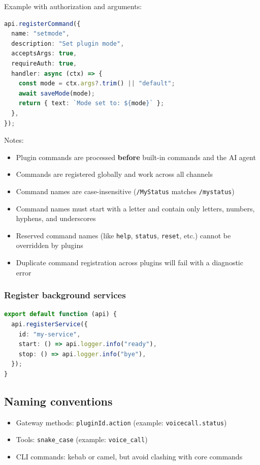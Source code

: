 Example with authorization and arguments:

\begin{lstlisting}[language=typescript]
api.registerCommand({
  name: "setmode",
  description: "Set plugin mode",
  acceptsArgs: true,
  requireAuth: true,
  handler: async (ctx) => {
    const mode = ctx.args?.trim() || "default";
    await saveMode(mode);
    return { text: `Mode set to: ${mode}` };
  },
});
\end{lstlisting}


Notes:

\begin{itemize}
  \item Plugin commands are processed \textbf{before} built-in commands and the AI agent
  \item Commands are registered globally and work across all channels
  \item Command names are case-insensitive (\texttt{/MyStatus} matches \texttt{/mystatus})
  \item Command names must start with a letter and contain only letters, numbers, hyphens, and underscores
  \item Reserved command names (like \texttt{help}, \texttt{status}, \texttt{reset}, etc.) cannot be overridden by plugins
  \item Duplicate command registration across plugins will fail with a diagnostic error
\end{itemize}


\subsubsection{Register background services}


\begin{lstlisting}[language=typescript]
export default function (api) {
  api.registerService({
    id: "my-service",
    start: () => api.logger.info("ready"),
    stop: () => api.logger.info("bye"),
  });
}
\end{lstlisting}


\subsection{Naming conventions}


\begin{itemize}
  \item Gateway methods: \texttt{pluginId.action} (example: \texttt{voicecall.status})
  \item Tools: \texttt{snake\_case} (example: \texttt{voice\_call})
  \item CLI commands: kebab or camel, but avoid clashing with core commands
\end{itemize}


